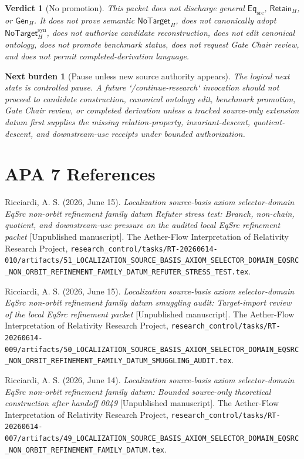 \documentclass[11pt]{article}
\newcommand{\EqSrc}{\mathsf{Eq}_{\mathrm{src}}}
\newcommand{\RetainH}{\mathsf{Retain}_{H}}
\newcommand{\GenH}{\mathsf{Gen}_{H}}
\newcommand{\NoTargetH}{\mathsf{NoTarget}_{H}}
\newcommand{\NoTargetSyn}{\mathsf{NoTarget}_{H}^{\mathrm{syn}}}
\newtheorem{verdict}{Verdict}
\newtheorem{nextburden}{Next burden}
\begin{document}
\begin{verdict}[No promotion]
This packet does not discharge general \(\EqSrc\), \(\RetainH\), or
\(\GenH\). It does not prove semantic \(\NoTargetH\), does not
canonically adopt \(\NoTargetSyn\), does not authorize candidate
reconstruction, does not edit canonical ontology, does not promote
benchmark status, does not request Gate Chair review, and does not permit
completed-derivation language.
\end{verdict}

\begin{nextburden}[Pause unless new source authority appears]
The logical next state is controlled pause. A future `/continue-research`
invocation should not proceed to candidate construction, canonical
ontology edit, benchmark promotion, Gate Chair review, or completed
derivation unless a tracked source-only extension datum first supplies
the missing relation-property, invariant-descent, quotient-descent, and
downstream-use receipts under bounded authorization.
\end{nextburden}

\section*{APA 7 References}

Ricciardi, A. S. (2026, June 15). \emph{Localization source-basis axiom
selector-domain EqSrc non-orbit refinement family datum Refuter stress
test: Branch, non-chain, quotient, and downstream-use pressure on the
audited local EqSrc refinement packet} [Unpublished manuscript]. The
Aether-Flow Interpretation of Relativity Research Project,
\texttt{research\_control/tasks/RT-20260614-010/artifacts/51\_LOCALIZATION\_SOURCE\_BASIS\_AXIOM\_SELECTOR\_DOMAIN\_EQSRC\_NON\_ORBIT\_REFINEMENT\_FAMILY\_DATUM\_REFUTER\_STRESS\_TEST.tex}.

Ricciardi, A. S. (2026, June 15). \emph{Localization source-basis axiom
selector-domain EqSrc non-orbit refinement family datum smuggling audit:
Target-import review of the local EqSrc refinement packet} [Unpublished
manuscript]. The Aether-Flow Interpretation of Relativity Research
Project,
\texttt{research\_control/tasks/RT-20260614-009/artifacts/50\_LOCALIZATION\_SOURCE\_BASIS\_AXIOM\_SELECTOR\_DOMAIN\_EQSRC\_NON\_ORBIT\_REFINEMENT\_FAMILY\_DATUM\_SMUGGLING\_AUDIT.tex}.

Ricciardi, A. S. (2026, June 14). \emph{Localization source-basis axiom
selector-domain EqSrc non-orbit refinement family datum: Bounded
source-only theoretical construction after handoff 0049} [Unpublished
manuscript]. The Aether-Flow Interpretation of Relativity Research
Project,
\texttt{research\_control/tasks/RT-20260614-007/artifacts/49\_LOCALIZATION\_SOURCE\_BASIS\_AXIOM\_SELECTOR\_DOMAIN\_EQSRC\_NON\_ORBIT\_REFINEMENT\_FAMILY\_DATUM.tex}.
\end{document}
